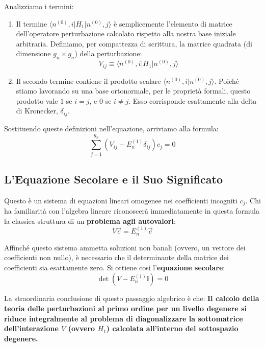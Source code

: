 Analizziamo i termini:
\begin{enumerate}
\item Il termine $\langle n^{(0)}, i \vert{} H_1 \vert{} n^{(0)}, j\rangle$ è semplicemente l'elemento di matrice dell'operatore perturbazione calcolato rispetto alla nostra base iniziale arbitraria. Definiamo, per compattezza di scrittura, la matrice quadrata (di dimensione $g_n \times g_n$) della perturbazione:
\begin{equation}
V_{ij} \equiv \langle n^{(0)}, i | H_1 | n^{(0)}, j\rangle
\end{equation}
\item Il secondo termine contiene il prodotto scalare $\langle n^{(0)}, i \vert{} n^{(0)}, j\rangle$. Poiché stiamo lavorando su una base ortonormale, per le proprietà formali, questo prodotto vale $1$ se $i=j$, e $0$ se $i \neq j$. Esso corrisponde esattamente alla delta di Kronecker, $\delta_{ij}$.
\end{enumerate}

Sostituendo queste definizioni nell'equazione, arriviamo alla formula:
\begin{equation}
\sum_{j=1}^{g_n} \left( V_{ij} - E_n^{(1)} \delta_{ij} \right) c_j = 0
\end{equation}

\subsection{L'Equazione Secolare e il Suo Significato}
Questo è un sistema di equazioni lineari omogenee nei coefficienti incogniti $c_j$. Chi ha familiarità con l'algebra lineare riconoscerà immediatamente in questa formula la classica struttura di un \textbf{problema agli autovalori}:
\begin{equation}
V \vec{c} = E_n^{(1)} \vec{c}
\end{equation}

Affinché questo sistema ammetta soluzioni non banali (ovvero, un vettore dei coefficienti non nullo), è necessario che il determinante della matrice dei coefficienti sia esattamente zero. Si ottiene così l'\textbf{equazione secolare}:
\begin{equation}
\det \left( V - E_n^{(1)} \mathbb{I} \right) = 0
\end{equation}

La straordinaria conclusione di questo passaggio algebrico è che:
\textbf{Il calcolo della teoria delle perturbazioni al primo ordine per un livello degenere si riduce integralmente al problema di diagonalizzare la sottomatrice dell'interazione $V$ (ovvero $H_1$) calcolata all'interno del sottospazio degenere.}

